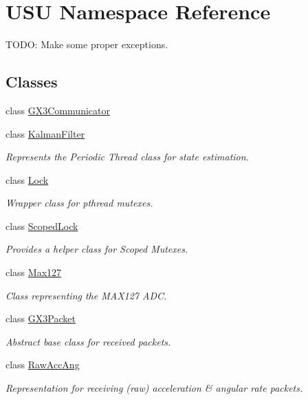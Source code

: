 \hypertarget{namespace_u_s_u}{\section{\-U\-S\-U \-Namespace \-Reference}
\label{namespace_u_s_u}
}


\-T\-O\-D\-O\-: \-Make some proper exceptions.  


\subsection*{\-Classes}
\begin{DoxyCompactItemize}
\item 
class \hyperlink{class_u_s_u_1_1_g_x3_communicator}{\-G\-X3\-Communicator}
\item 
class \hyperlink{class_u_s_u_1_1_kalman_filter}{\-Kalman\-Filter}
\begin{DoxyCompactList}\small\item\em \-Represents the \-Periodic \-Thread class for state estimation. \end{DoxyCompactList}\item 
class \hyperlink{class_u_s_u_1_1_lock}{\-Lock}
\begin{DoxyCompactList}\small\item\em \-Wrapper class for pthread mutexes. \end{DoxyCompactList}\item 
class \hyperlink{class_u_s_u_1_1_scoped_lock}{\-Scoped\-Lock}
\begin{DoxyCompactList}\small\item\em \-Provides a helper class for \-Scoped \-Mutexes. \end{DoxyCompactList}\item 
class \hyperlink{class_u_s_u_1_1_max127}{\-Max127}
\begin{DoxyCompactList}\small\item\em \-Class representing the \-M\-A\-X127 \-A\-D\-C. \end{DoxyCompactList}\item 
class \hyperlink{class_u_s_u_1_1_g_x3_packet}{\-G\-X3\-Packet}
\begin{DoxyCompactList}\small\item\em \-Abstract base class for received packets. \end{DoxyCompactList}\item 
class \hyperlink{class_u_s_u_1_1_raw_acc_ang}{\-Raw\-Acc\-Ang}
\begin{DoxyCompactList}\small\item\em \-Representation for receiving (raw) acceleration \& angular rate packets. \end{DoxyCompactList}\item 

\end{DoxyCompactItemize}
